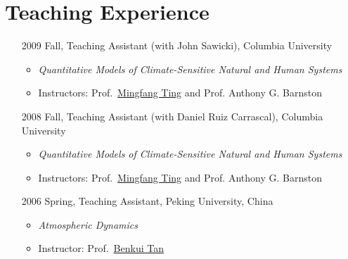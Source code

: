 \documentclass[11pt]{article}
\newcommand{\benkui}{\href{http://www.phy.pku.edu.cn/personnel/das/bktan.xml}{Benkui Tan}}
\newcommand{\mingfang}{\href{http://www.ldeo.columbia.edu/user/ting}{Mingfang Ting}}
\begin{document}
\section{Teaching Experience} 
\begin{itemize}[leftmargin=10ex]
	\item[2009] Fall, Teaching  Assistant (with John Sawicki), Columbia University
	\begin{itemize}[leftmargin=0ex]
		\item \textit{Quantitative Models of Climate-Sensitive Natural and Human Systems}
		\item Instructors: Prof.~\mingfang{} and Prof. Anthony G. Barnston 
		\end{itemize}
		
	\item[2008] Fall, Teaching  Assistant (with Daniel Ruiz Carrascal),  Columbia University
	\begin{itemize}[leftmargin=0ex]
		\item \textit{Quantitative Models of Climate-Sensitive Natural and Human Systems}
		\item Instructors: Prof.~\mingfang{} and Prof. Anthony G. Barnston 
		\end{itemize}
		
	\item[2006] Spring, Teaching  Assistant, Peking University, China
	\begin{itemize}[leftmargin=0ex]
		\item \textit{Atmospheric Dynamics}
		\item Instructor: Prof.~\benkui{}
		\end{itemize}
	\end{itemize}
\end{document}

